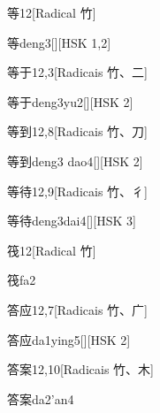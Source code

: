 \begin{entry}{等}{12}[Radical ⽵]
  \begin{phonetics}{等}{deng3}[][HSK 1,2]
  \end{phonetics}
\end{entry}

\begin{entry}{等于}{12,3}[Radicais ⽵、⼆]
  \begin{phonetics}{等于}{deng3yu2}[][HSK 2]
  \end{phonetics}
\end{entry}

\begin{entry}{等到}{12,8}[Radicais ⽵、⼑]
  \begin{phonetics}{等到}{deng3 dao4}[][HSK 2]
  \end{phonetics}
\end{entry}

\begin{entry}{等待}{12,9}[Radicais ⽵、⼻]
  \begin{phonetics}{等待}{deng3dai4}[][HSK 3]
  \end{phonetics}
\end{entry}

\begin{entry}{筏}{12}[Radical ⽵]
  \begin{phonetics}{筏}{fa2}
  \end{phonetics}
\end{entry}

\begin{entry}{答应}{12,7}[Radicais ⽵、⼴]
  \begin{phonetics}{答应}{da1ying5}[][HSK 2]
  \end{phonetics}
\end{entry}

\begin{entry}{答案}{12,10}[Radicais ⽵、⽊]
  \begin{phonetics}{答案}{da2'an4}
  \end{phonetics}
\end{entry}

